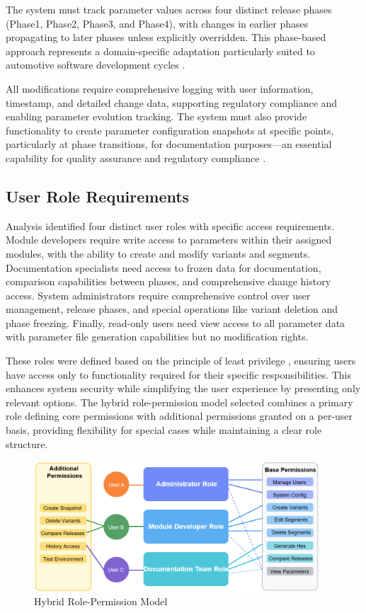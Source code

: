 The system must track parameter values across four distinct release phases (Phase1, Phase2, Phase3, and Phase4), with changes in earlier phases propagating to later phases unless explicitly overridden. This phase-based approach represents a domain-specific adaptation particularly suited to automotive software development cycles \cite{broy2006challenges}.

All modifications require comprehensive logging with user information, timestamp, and detailed change data, supporting regulatory compliance and enabling parameter evolution tracking. The system must also provide functionality to create parameter configuration snapshots at specific points, particularly at phase transitions, for documentation purposes—an essential capability for quality assurance and regulatory compliance \cite{staron2021automotive}.

\subsection{User Role Requirements}
\label{subsec:user-role-requirements}

Analysis identified four distinct user roles with specific access requirements. Module developers require write access to parameters within their assigned modules, with the ability to create and modify variants and segments. Documentation specialists need access to frozen data for documentation, comparison capabilities between phases, and comprehensive change history access. System administrators require comprehensive control over user management, release phases, and special operations like variant deletion and phase freezing. Finally, read-only users need view access to all parameter data with parameter file generation capabilities but no modification rights.

These roles were defined based on the principle of least privilege \cite{sandhu1998role}, ensuring users have access only to functionality required for their specific responsibilities. This enhances system security while simplifying the user experience by presenting only relevant options. The hybrid role-permission model selected combines a primary role defining core permissions with additional permissions granted on a per-user basis, providing flexibility for special cases while maintaining a clear role structure.

\begin{figure}[h]
    \centering
    \includegraphics[width=0.95\textwidth]{figures/hybrid_role_permission_model.png}
    \caption{Hybrid Role-Permission Model}
    \label{fig:hybrid-role-model}
\end{figure}

